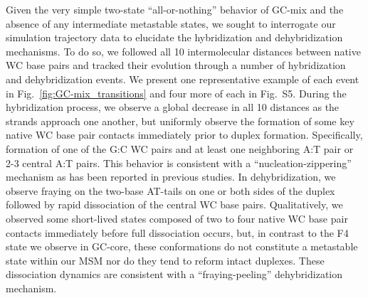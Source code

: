 \documentclass[journal=jpcbfk,manuscript=article]{achemso}
\newcommand*{\blauw}[1]{{#1}}
\begin{document}
Given the very simple two-state ``all-or-nothing'' behavior of GC-mix and the absence of any intermediate metastable states, we sought to interrogate our simulation trajectory data to elucidate the hybridization and dehybridization mechanisms. To do so, we followed all 10 intermolecular distances between native WC base pairs and tracked their evolution through a number of hybridization and dehybridization events. We present one representative example of each event in Fig.~\ref{fig:GC-mix_transitions} and four more of each in \blauw{Fig.~S5}. During the hybridization process, we observe a global decrease in all 10 distances as the strands approach one another, but uniformly observe the formation of some key native WC base pair contacts immediately prior to duplex formation. Specifically, formation of one of the G:C WC pairs and at least one neighboring A:T pair or 2-3 central A:T pairs. This behavior is consistent with a ``nucleation-zippering'' mechanism as has been reported in previous studies.\citep{Wetmur1968KineticsDNA, Porschke1971CooperativeTransition, Sambriski2009SequencePathways,  Yin2011KineticsHybridization} In dehybridization, we observe fraying on the two-base AT-tails on one or both sides of the duplex followed by rapid dissociation of the central WC base pairs. Qualitatively, we observed some short-lived states composed of two to four native WC base pair contacts immediately before full dissociation occurs, but, in contrast to the F4 state we observe in GC-core, these conformations do not constitute a metastable state within our MSM nor do they tend to reform intact duplexes. These dissociation dynamics are consistent with a ``fraying-peeling'' dehybridization mechanism.\citep{Wong2008TheSimulations, Perez2010Real-timeUnfolding, Zgarbova2014BaseRNA} 
\end{document}
